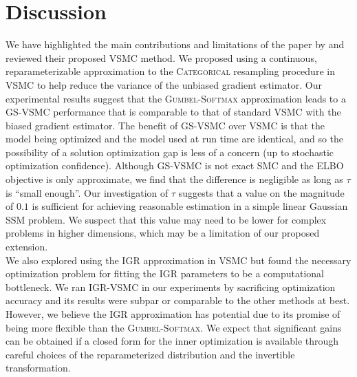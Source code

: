\documentclass[12pt]{article}
\newcommand{\vsmc}{\textsc{VSMC}\xspace}
\newcommand{\gsvsmc}{\textsc{GS-VSMC}\xspace}
\newcommand{\igrvsmc}{\textsc{IGR-VSMC}\xspace}
\newcommand{\smc}{\textsc{SMC}\xspace}
\newcommand{\elbo}{\textsc{ELBO}\xspace}
\newcommand{\categorical}{\textsc{Categorical}\xspace}
\newcommand{\gumbelsoftmax}{\textsc{Gumbel-Softmax}\xspace}
\newcommand{\igr}{\textsc{IGR}\xspace}
\newcommand{\ssm}{\textsc{SSM}\xspace}
\begin{document}
\section{Discussion}\label{sec:discussion}

We have highlighted the main contributions and limitations of the paper by \textcite{Naesseth:2018} and reviewed their proposed \vsmc method. We proposed using a continuous, reparameterizable approximation to the \categorical resampling procedure in \vsmc to help reduce the variance of the unbiased gradient estimator. Our experimental results suggest that the \gumbelsoftmax approximation leads to a \gsvsmc performance that is comparable to that of standard \vsmc with the biased gradient estimator. The benefit of \gsvsmc over \vsmc is that the model being optimized and the model used at run time are identical, and so the possibility of a solution optimization gap is less of a concern (up to stochastic optimization confidence). Although \gsvsmc is not exact \smc and the \elbo objective is only approximate, we find that the difference is negligible as long as $\tau$ is ``small enough''. Our investigation of $\tau$ suggests that a value on the magnitude of $0.1$ is sufficient for achieving reasonable estimation in a simple linear Gaussian \ssm problem. We suspect that this value may need to be lower for complex problems in higher dimensions, which may be a limitation of our proposed extension.
\\

We also explored using the \igr approximation in \vsmc but found the necessary optimization problem for fitting the \igr parameters to be a computational bottleneck. We ran \igrvsmc in our experiments by sacrificing optimization accuracy and its results were subpar or comparable to the other methods at best. However, we believe the \igr approximation has potential due to its promise of being more flexible than the \gumbelsoftmax. We expect that significant gains can be obtained if a closed form for the inner optimization is available through careful choices of the reparameterized distribution and the invertible transformation.


\newpage

\printbibliography
\end{document}
